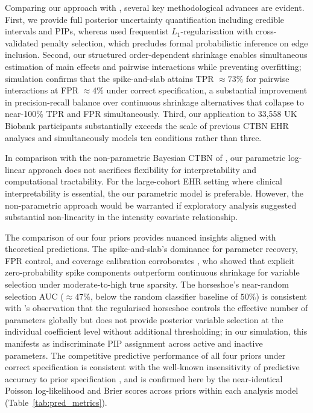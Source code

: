 \documentclass[12pt]{article}
\begin{document}
Comparing our approach with \citet{faruqui2021functional}, several key 
methodological advances are evident. First, we provide full posterior 
uncertainty quantification including credible intervals and PIPs, whereas 
\citet{faruqui2021functional} used frequentist $L_1$-regularisation with 
cross-validated penalty selection, which precludes formal probabilistic 
inference on edge inclusion. Second, our structured order-dependent shrinkage 
enables simultaneous estimation of main effects and pairwise interactions while 
preventing overfitting; simulation confirms that the spike-and-slab attains 
TPR $\approx 73\%$ for pairwise interactions at FPR $\approx 4\%$ under correct 
specification, a substantial improvement in precision-recall balance over 
continuous shrinkage alternatives that collapse to near-100\% TPR and FPR 
simultaneously. Third, our application to 33,558 UK Biobank participants 
substantially exceeds the scale of previous CTBN EHR analyses and simultaneously 
models ten conditions rather than three.

In comparison with the non-parametric Bayesian CTBN of \citet{yang2016learning, lasserre2021constraint}, 
our parametric log-linear approach does not sacrifices flexibility for interpretability 
and computational tractability. For the large-cohort EHR setting where clinical interpretability is essential, the our parametric model is preferable. However, the non-parametric approach would be warranted if exploratory analysis suggested 
substantial non-linearity in the intensity covariate relationship.

The comparison of our four priors provides nuanced insights aligned with 
theoretical predictions. The spike-and-slab's dominance for parameter recovery, 
FPR control, and coverage calibration corroborates \citet{bhadra2019lasso}, who 
showed that explicit zero-probability spike components outperform continuous 
shrinkage for variable selection under moderate-to-high true sparsity. The 
horseshoe's near-random selection AUC ($\approx 47\%$, below the random 
classifier baseline of $50\%$) is consistent with \citet{piironen2017sparsity}'s 
observation that the regularised horseshoe controls the effective number of 
parameters globally but does not provide posterior variable selection at the 
individual coefficient level without additional thresholding; in our simulation, 
this manifests as indiscriminate PIP assignment across active and inactive 
parameters. The competitive predictive performance of all four priors under 
correct specification is consistent with the well-known insensitivity of 
predictive accuracy to prior specification \citep{VehtariGelmanGabry2017}, and 
is confirmed here by the near-identical Poisson log-likelihood and Brier scores 
across priors within each analysis model (Table~\ref{tab:pred_metrics}).
\end{document}
